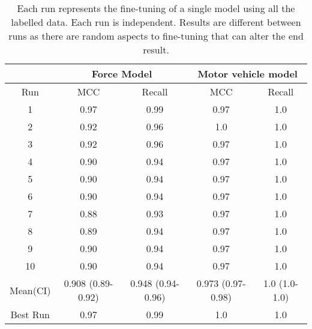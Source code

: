 \begin{table}[]
\begin{tabular}{@{}ccccc@{}}
\toprule
\multicolumn{1}{l}{} & \multicolumn{2}{c}{Force Model}       & \multicolumn{2}{c}{Motor vehicle model} \\\midrule
Run                  & MCC               & Recall            & MCC                & Recall   \\\midrule
1                    & 0.97              & 0.99              & 0.97               & 1.0        \\
2                    & 0.92              & 0.96              & 1.0                  & 1.0        \\
3                    & 0.92              & 0.96              & 0.97               & 1.0        \\
4                    & 0.90               & 0.94              & 0.97               & 1.0        \\
5                    & 0.90               & 0.94              & 0.97               & 1.0        \\
6                    & 0.90               & 0.94              & 0.97               & 1.0        \\
7                    & 0.88              & 0.93              & 0.97               & 1.0        \\
8                    & 0.89              & 0.94              & 0.97               & 1.0        \\
9                    & 0.90               & 0.94              & 0.97               & 1.0        \\
10                   & 0.90               & 0.94              & 0.97               & 1.0        \\\midrule
Mean(CI)             & 0.908 (0.89-0.92) & 0.948 (0.94-0.96) & 0.973 (0.97-0.98)  & 1.0 (1.0-1.0)  \\\midrule
Best Run             & 0.97              & 0.99              & 1.0                  & 1.0        \\ \bottomrule
\end{tabular}
\caption[Model metrics. PF1 data. Force used and motor vehicle stolen models]{\label{tab:final-model} Each run represents the fine-tuning of a single model using all the labelled data. Each run is independent. Results are different between runs as there are random aspects to fine-tuning that can alter the end result. }
\end{table}

